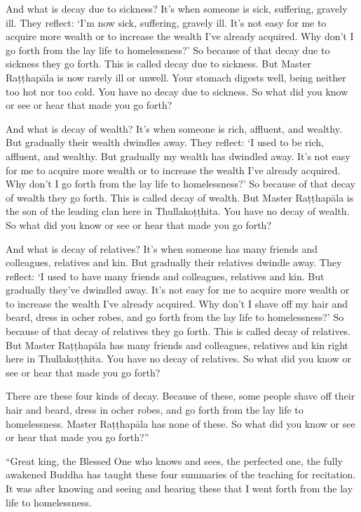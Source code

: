 \documentclass[12pt,openany]{book}%
\begin{document}
And what is decay due to sickness? It’s when someone is sick, suffering, gravely ill. They reflect: ‘I’m now sick, suffering, gravely ill. It’s not easy for me to acquire more wealth or to increase the wealth I’ve already acquired. Why don’t I go forth from the lay life to homelessness?’ So because of that decay due to sickness they go forth. This is called decay due to sickness. But Master \textsanskrit{Raṭṭhapāla} is now rarely ill or unwell. Your stomach digests well, being neither too hot nor too cold. You have no decay due to sickness. So what did you know or see or hear that made you go forth? 

And what is decay of wealth? It’s when someone is rich, affluent, and wealthy. But gradually their wealth dwindles away. They reflect: ‘I used to be rich, affluent, and wealthy. But gradually my wealth has dwindled away. It’s not easy for me to acquire more wealth or to increase the wealth I’ve already acquired. Why don’t I go forth from the lay life to homelessness?’ So because of that decay of wealth they go forth. This is called decay of wealth. But Master \textsanskrit{Raṭṭhapāla} is the son of the leading clan here in \textsanskrit{Thullakoṭṭhita}. You have no decay of wealth. So what did you know or see or hear that made you go forth? 

And what is decay of relatives? It’s when someone has many friends and colleagues, relatives and kin. But gradually their relatives dwindle away. They reflect: ‘I used to have many friends and colleagues, relatives and kin. But gradually they’ve dwindled away. It’s not easy for me to acquire more wealth or to increase the wealth I’ve already acquired. Why don’t I shave off my hair and beard, dress in ocher robes, and go forth from the lay life to homelessness?’ So because of that decay of relatives they go forth. This is called decay of relatives. But Master \textsanskrit{Raṭṭhapāla} has many friends and colleagues, relatives and kin right here in \textsanskrit{Thullakoṭṭhita}. You have no decay of relatives. So what did you know or see or hear that made you go forth? 

There are these four kinds of decay. Because of these, some people shave off their hair and beard, dress in ocher robes, and go forth from the lay life to homelessness. Master \textsanskrit{Raṭṭhapāla} has none of these. So what did you know or see or hear that made you go forth?” 

“Great king, the Blessed One who knows and sees, the perfected one, the fully awakened Buddha has taught these four summaries of the teaching for recitation. It was after knowing and seeing and hearing these that I went forth from the lay life to homelessness. 
\end{document}
